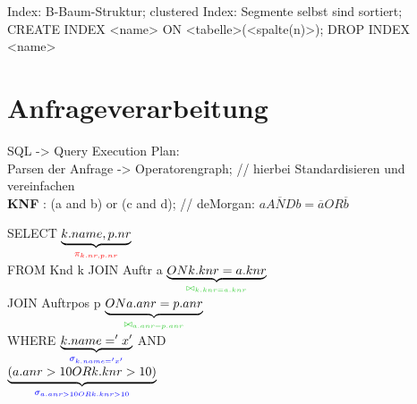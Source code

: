 Index: B-Baum-Struktur; clustered Index: Segmente selbst sind sortiert;  
CREATE INDEX <name> ON 	<tabelle>(<spalte(n)>); DROP INDEX <name>

\section*{Anfrageverarbeitung}

SQL -> Query Execution Plan:\\
Parsen der Anfrage -> Operatorengraph; // hierbei Standardisieren und vereinfachen  \\
\textbf{KNF} : (a and b) or (c and d); // deMorgan: $\overline{a AND b} = \overline{a} OR \overline{b}$

\newcommand{\proj}{\textcolor{red}{\ensuremath{\pi_{k.nr,p.nr}}}}
\newcommand{\joink}{\textcolor{darkgreen}{\ensuremath{\bowtie_{k.knr = a.knr}}}}
\newcommand{\joina}{\textcolor{darkgreen}{\ensuremath{\bowtie_{a.anr = p.anr}}}}
\newcommand{\selk}{\textcolor{blue}{\ensuremath{\sigma_{k.name = 'x'}} }}
\newcommand{\selor}{\textcolor{blue}{\ensuremath{\sigma_{a.anr > 10 OR k.knr >10 }}}}
\newcommand{\grpi}[1]{\textcolor{gray}{ \ensuremath{\pi_{ #1 }} }}

\begin{minipage}{0.25\textwidth}
SELECT $\underbrace{k.name, p.nr}_{ \proj }$ \\
FROM Knd k JOIN Auftr a $\underbrace{ ON k.knr = a.knr}_{\joink}$ \\
JOIN Auftrpos p $\underbrace{ ON a.anr =p.anr}_{\joina} $\\
WHERE $\underbrace{k.name = 'x'}_{\selk}$ AND\\
$\underbrace{(a.anr > 10 OR k.knr >10)}_{\selor}$
\end{minipage}
% 
\begin{minipage}{0.25\textwidth}
\end{minipage}

